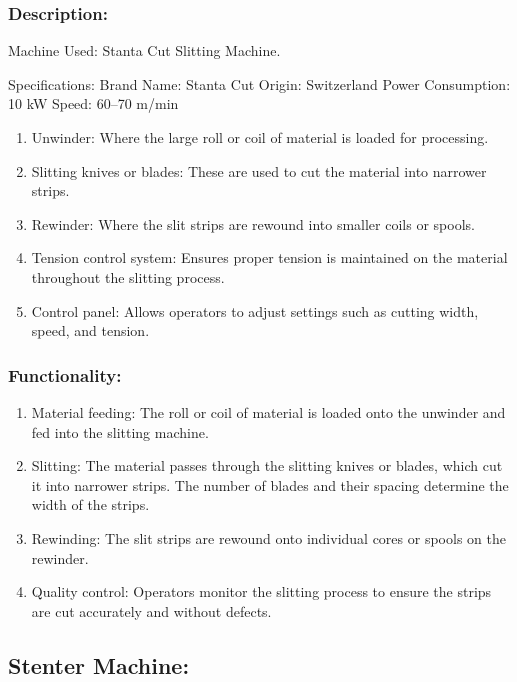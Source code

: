 \subsubsection{Description:}

Machine Used: Stanta Cut Slitting Machine.

Specifications:
Brand Name: Stanta Cut
Origin: Switzerland
Power Consumption: 10 kW
Speed: 60–70 m/min


\begin{enumerate}
\item
  Unwinder: Where the large roll or coil of material is loaded for
  processing.
\item
  Slitting knives or blades: These are used to cut the material into
  narrower strips.
\item
  Rewinder: Where the slit strips are rewound into smaller coils or
  spools.
\item
  Tension control system: Ensures proper tension is maintained on the
  material throughout the slitting process.
\item
  Control panel: Allows operators to adjust settings such as cutting
  width, speed, and tension.
\end{enumerate}

\subsubsection{Functionality:}

\begin{enumerate}
\item
  Material feeding: The roll or coil of material is loaded onto the
  unwinder and fed into the slitting machine.
\item
  Slitting: The material passes through the slitting knives or blades,
  which cut it into narrower strips. The number of blades and their
  spacing determine the width of the strips.
\item
  Rewinding: The slit strips are rewound onto individual cores or spools
  on the rewinder.
\item
  Quality control: Operators monitor the slitting process to ensure the
  strips are cut accurately and without defects.
\end{enumerate}


\subsection{Stenter Machine:\cite{stenter_machine}}

